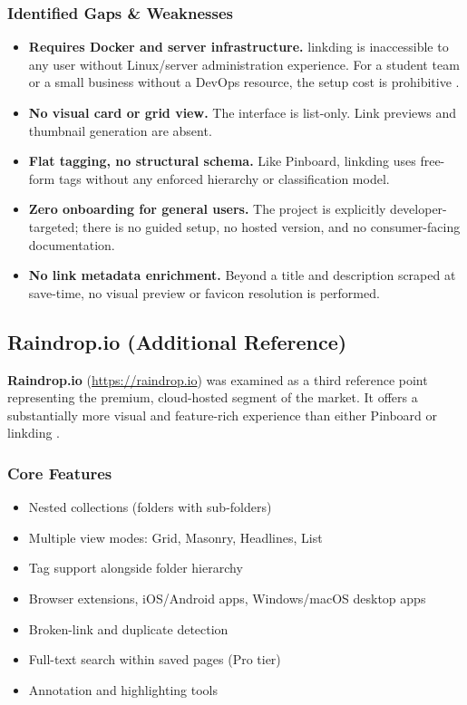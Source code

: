 \documentclass[11pt,a4paper]{book}
\begin{document}
\subsubsection{Identified Gaps \& Weaknesses}
 
\begin{itemize}
    \item \textbf{Requires Docker and server infrastructure.} linkding is inaccessible to any user without Linux/server administration experience. For a student team or a small business without a DevOps resource, the setup cost is prohibitive \citep{linkding2020github}.
    \item \textbf{No visual card or grid view.} The interface is list-only. Link previews and thumbnail generation are absent.
    \item \textbf{Flat tagging, no structural schema.} Like Pinboard, linkding uses free-form tags without any enforced hierarchy or classification model.
    \item \textbf{Zero onboarding for general users.} The project is explicitly developer-targeted; there is no guided setup, no hosted version, and no consumer-facing documentation.
    \item \textbf{No link metadata enrichment.} Beyond a title and description scraped at save-time, no visual preview or favicon resolution is performed.
\end{itemize}
 
 
\subsection{Raindrop.io (Additional Reference)}
 
\textbf{Raindrop.io} (\url{https://raindrop.io}) was examined as a third reference point representing the premium, cloud-hosted segment of the market. It offers a substantially more visual and feature-rich experience than either Pinboard or linkding \citep{raindropio2024}.
 
\subsubsection{Core Features}
 
\begin{itemize}
    \item Nested collections (folders with sub-folders)
    \item Multiple view modes: Grid, Masonry, Headlines, List
    \item Tag support alongside folder hierarchy
    \item Browser extensions, iOS/Android apps, Windows/macOS desktop apps
    \item Broken-link and duplicate detection
    \item Full-text search within saved pages (Pro tier)
    \item Annotation and highlighting tools
\end{itemize}
 
\end{document}
